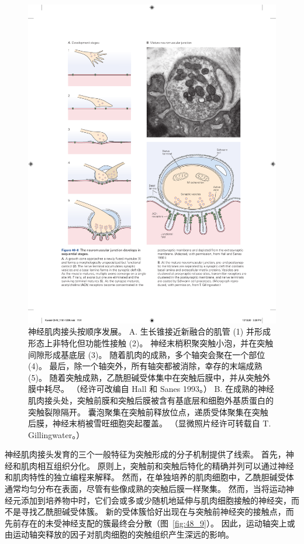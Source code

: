 \begin{figure}[htbp]
	\centering
	\includegraphics[width=0.9\linewidth]{chap48/fig_48_8}
	\caption{神经肌肉接头按顺序发展。 A. 生长锥接近新融合的肌管 (1) 并形成形态上非特化但功能性接触 (2)。 神经末梢积聚突触小泡，并在突触间隙形成基底层 (3)。 随着肌肉的成熟，多个轴突会聚在一个部位 (4)。 最后，除一个轴突外，所有轴突都被消除，幸存的末端成熟 (5)。 随着突触成熟，乙酰胆碱受体集中在突触后膜中，并从突触外膜中耗尽。 （经许可改编自 Hall 和 Sanes 1993。） B. 在成熟的神经肌肉接头处，突触前膜和突触后膜被含有基底层和细胞外基质蛋白的突触裂隙隔开。 囊泡聚集在突触前释放位点，递质受体聚集在突触后膜，神经末梢被雪旺细胞突起覆盖。 （显微照片经许可转载自 T. Gillingwater。）}
	\label{fig:48_8}
\end{figure}

神经肌肉接头发育的三个一般特征为突触形成的分子机制提供了线索。 
首先，神经和肌肉相互组织分化。
原则上，突触前和突触后特化的精确并列可以通过神经和肌肉特性的独立编程来解释。
然而，在单独培养的肌肉细胞中，乙酰胆碱受体通常均匀分布在表面，尽管有些像成熟的突触后膜一样聚集。
然而，当将运动神经元添加到培养物中时，它们会或多或少随机地延伸与肌肉细胞接触的神经突，而不是寻找乙酰胆碱受体簇。
新的受体簇恰好出现在与突触前神经突的接触点，而先前存在的未受神经支配的簇最终会分散（图~\ref{fig:48_9}）。
因此，运动轴突上或由运动轴突释放的因子对肌肉细胞的突触组织产生深远的影响。


